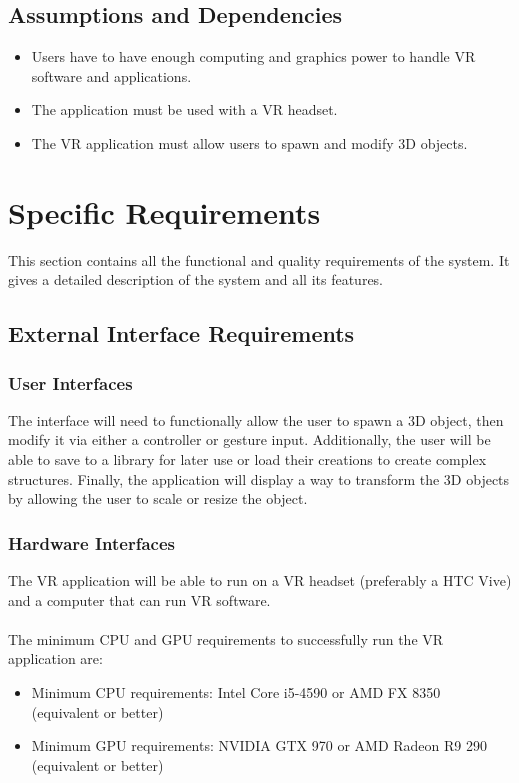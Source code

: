 \documentclass[letterpaper,draftclsnofoot,onecolumn,10 pt,compsoc]{IEEEtran}
\begin{document}
\subsection{Assumptions and Dependencies}
\begin{itemize}
\item Users have to have enough computing and graphics power to handle VR software and applications.
\item The application must be used with a VR headset.
\item The VR application must allow users to spawn and modify 3D objects.
\end{itemize}


\newpage


\section{Specific Requirements} %
This section contains all the functional and quality requirements of the system. It gives a detailed description of the system and all its features.

\subsection{External Interface Requirements}

\subsubsection{User Interfaces}
The interface will need to functionally allow the user to spawn a 3D object, then modify it via either a controller or gesture input. Additionally, the user will be able to save to a library for later use or load their creations to create complex structures. Finally, the application will display a way to transform the 3D objects by allowing the user to scale or resize the object.

\subsubsection{Hardware Interfaces}
The VR application will be able to run on a VR headset (preferably a HTC Vive) and a computer that can run VR software.
\\ \\
The minimum CPU and GPU requirements to successfully run the VR application are:
\begin{itemize}
\item Minimum CPU requirements: Intel Core i5-4590 or AMD FX 8350 (equivalent or better)
\item Minimum GPU requirements:  NVIDIA GTX 970 or AMD Radeon R9 290 (equivalent or better)
\end{itemize}
\end{document}
